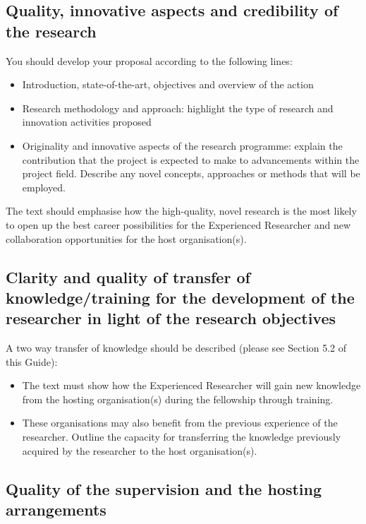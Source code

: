 \documentclass[a4paper,11pt]{article}
\begin{document}
\subsection{Quality, innovative aspects and credibility of the research}
\label{sec:quality}

You should develop your proposal according to the following lines:
\begin{itemize}
\item Introduction, state-of-the-art, objectives and overview of the action
\item Research methodology and approach: highlight the type of research and innovation activities proposed
\item Originality and innovative aspects of the research programme: explain the contribution that the project is expected to make to advancements within the project field. Describe any novel concepts, approaches or methods that will be employed.
\end{itemize}
The text should emphasise how the high-quality, novel research is the most likely to open up the best career possibilities for the Experienced Researcher and new collaboration opportunities for the host organisation(s). 

\subsection{Clarity and quality of transfer of knowledge/training for the development of the researcher in light of the research objectives}
\label{sec:transfer}

A two way transfer of knowledge should be described (please see Section 5.2 of this Guide):
\begin{itemize}
\item The text must show how the Experienced Researcher will gain new knowledge from the hosting organisation(s) during the fellowship through training. 
\item These organisations may also benefit from the previous experience of the researcher. Outline the capacity for transferring the knowledge previously acquired by the researcher to the host organisation(s).
\end{itemize}

\subsection{Quality of the supervision and the hosting arrangements}
\label{sec:supervision}
\end{document}
